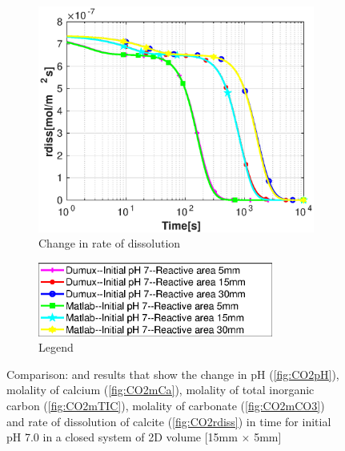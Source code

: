 \begin{figure}
\begin{subfigure}{.5\linewidth}
        \label{fig:dvmpH7mCO3}
    \end{subfigure}%
    \hfill
    \begin{subfigure}{.5\linewidth}
            \centering
        \includegraphics[width=\textwidth]{PICTURES/dvm_pH7_rdiss.eps}
        \caption{Change in rate of dissolution}
        \label{fig:dvmpH7rdiss}
    \end{subfigure}%
   \hfill
   \begin{subfigure}{.5\linewidth}
            \centering
        \includegraphics[width=0.85\textwidth]{PICTURES/dvm_pH7_legend.eps}
        \caption{Legend}
        \label{fig:dvmpH7legend}
    \end{subfigure}%
   \caption{Comparison: \DuMuX and \MATLAB results that show the change in pH (\cref{fig:CO2pH}), molality of calcium (\cref{fig:CO2mCa}), molality of total inorganic carbon (\cref{fig:CO2mTIC}), molality of carbonate (\cref{fig:CO2mCO3}) and rate of dissolution of calcite (\cref{fig:CO2rdiss}) in time for initial pH 7.0 in a closed system of 2D volume [15mm $\times$ 5mm]} 
    \label{fig:comparisionDumuxMatlab_pH7.0}
\end{figure}


